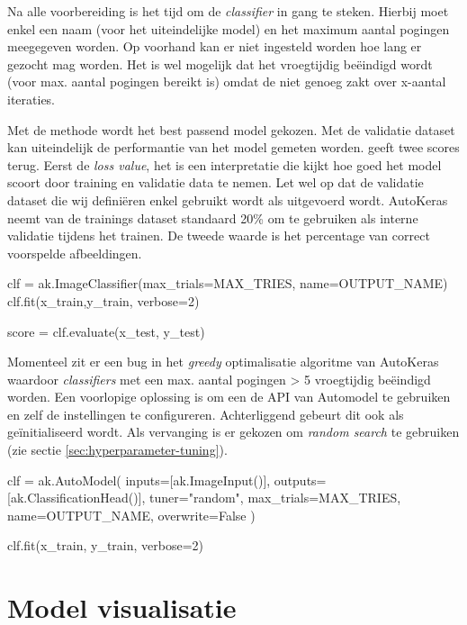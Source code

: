Na alle voorbereiding is het tijd om de \textit{classifier} in gang te steken. Hierbij moet enkel een naam (voor het uiteindelijke model) en het maximum aantal pogingen meegegeven worden. Op voorhand kan er niet ingesteld worden hoe lang er gezocht mag worden. Het is wel mogelijk dat het vroegtijdig beëindigd wordt (voor max. aantal pogingen bereikt is) omdat de  niet genoeg zakt over x-aantal iteraties.

Met de  methode wordt het best passend model gekozen. Met de validatie dataset kan uiteindelijk de performantie van het model gemeten worden.  geeft twee scores terug. Eerst de \textit{loss value}, het is een interpretatie die kijkt hoe goed het model scoort door training en validatie data te nemen. Let wel op dat de validatie dataset die wij definiëren enkel gebruikt wordt als  uitgevoerd wordt. AutoKeras neemt van de trainings dataset standaard 20\% om te gebruiken als interne validatie tijdens het trainen. De tweede waarde is het percentage van correct voorspelde afbeeldingen.

\bigskip

\begin{python}
clf = ak.ImageClassifier(max_trials=MAX_TRIES, name=OUTPUT_NAME)
clf.fit(x_train,y_train, verbose=2)

score = clf.evaluate(x_test, y_test)
\end{python}

Momenteel zit er een bug in het \textit{greedy} optimalisatie algoritme van AutoKeras waardoor \textit{classifiers} met een max. aantal pogingen > 5 vroegtijdig beëindigd worden. Een voorlopige oplossing is om een de API van Automodel te gebruiken en zelf de instellingen te configureren. Achterliggend gebeurt dit ook als  geïnitialiseerd wordt. Als vervanging is er gekozen om \textit{random search} te gebruiken (zie sectie \ref{sec:hyperparameter-tuning}).

\bigskip

\begin{python}
clf = ak.AutoModel(
    inputs=[ak.ImageInput()], 
    outputs=[ak.ClassificationHead()], 
    tuner="random",
    max_trials=MAX_TRIES, 
    name=OUTPUT_NAME,
    overwrite=False
    )
    
clf.fit(x_train, y_train, verbose=2)
\end{python}

\section{Model visualisatie}
\label{sec:vis-autokeras}

